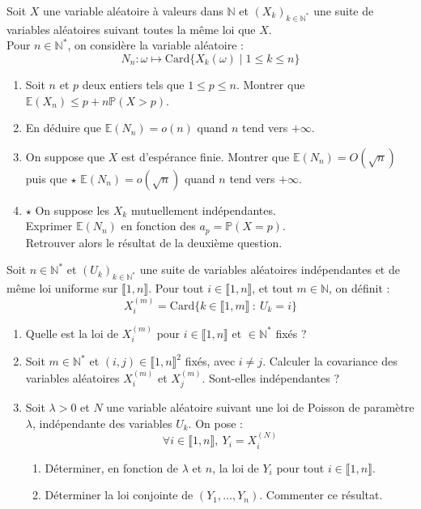 \documentclass[french,a4paper]{article}
\renewcommand{\P}{\mathbb{P}}
\newcommand{\N}{\mathbb{N}}
\newcommand{\st}{^*}
\newcommand{\E}{\mathbb{E}}
\newcommand{\card}{\text{Card}}
\theoremstyle{plain}
\theoremstyle{definition}
\theoremstyle{remark}
\begin{document}
\begin{ex}{}
	Soit $X$ une variable aléatoire à valeurs dans $\N$ et $(X_k)_{k\in\N\st}$ une suite de variables aléatoires suivant toutes la même loi que $X$. \\ Pour $n\in\N\st$, on considère la variable aléatoire : $$N_n:\omega\mapsto\card\{X_k(\omega)\mid 1\leqslant k\leqslant n\}$$
	\begin{enumerate}
		\item Soit $n$ et $p$ deux entiers tels que $1\leqslant p\leqslant n$. Montrer que $\E(X_n)\leqslant p+n\P(X>p)$.
		\item En déduire que $\E(N_n)=o(n)$ quand $n$ tend vers $+\infty$.
		\item On suppose que $X$ est d'espérance finie. Montrer que $\E(N_n)=O(\sqrt{n})$ puis que $\star$ $\E(N_n)=o(\sqrt{n})$ quand $n$ tend vers $+\infty$.
		\item $\star$ On suppose les $X_k$ mutuellement indépendantes. \\
		Exprimer $\E(N_n)$ en fonction des $a_p=\P(X=p)$. \\
		Retrouver alors le résultat de la deuxième question.
	\end{enumerate}
\end{ex}

\begin{ex}{}
	Soit $n\in\N\st$ et $(U_k)_{k\in\N\st}$ une suite de variables aléatoires indépendantes et de même loi uniforme sur $\llbracket1,n\rrbracket$. Pour tout $i\in\llbracket1,n\rrbracket$, et tout $m\in\N$, on définit : $$X_i^{(m)}=\card\{k\in\llbracket1,m\rrbracket\ : \ U_k=i\}$$
	\begin{enumerate}
		\item Quelle est la loi de $X_i^{(m)}$ pour $i\in\llbracket1,n\rrbracket$ et $\in\N\st$ fixés ?
		\item Soit $m\in\N\st$ et $(i,j)\in\llbracket1,n\rrbracket^2$ fixés, avec $i\ne j$. Calculer la covariance des variables aléatoires $X_i^{(m)}$ et $X_j^{(m)}$. Sont-elles indépendantes ?
		\item Soit $\lambda>0$ et $N$ une variable aléatoire suivant une loi de Poisson de paramètre $\lambda$, indépendante des variables $U_k$. On pose : $$\forall i\in\llbracket1,n\rrbracket,\ Y_i=X_i^{(N)}$$
		\begin{enumerate}[label=\alph*.]
			\item Déterminer, en fonction de $\lambda$ et $n$, la loi de $Y_i$ pour tout $i\in\llbracket1,n\rrbracket$.
			\item Déterminer la loi conjointe de $(Y_1,\ldots,Y_n)$. Commenter ce résultat.
		\end{enumerate}
	\end{enumerate}
\end{ex}
\end{document}
